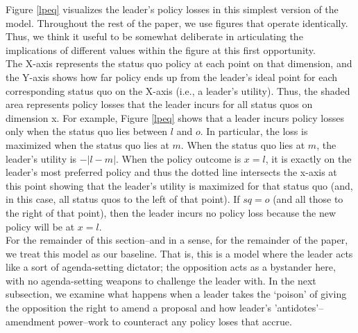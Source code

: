 \documentclass[12pt]{article}
\theoremstyle{plain}		      \newtheorem{assn}{Assumption}
\theoremstyle{plain}		      \newtheorem{prop}{Proposition}
\theoremstyle{plain}		      \newtheorem{lemma}{Lemma}
\theoremstyle{plain}	          \newtheorem{imp}{Implication}
\theoremstyle{plain}	          \newtheorem{hyp}{Hypothesis}
\theoremstyle{definition}		  \newtheorem{defn}{Definition}
\theoremstyle{remark}	          \newtheorem{rem}{Remark}
\theoremstyle{definition}         \newtheorem{case}{Case}
\begin{document}
\indent Figure \ref{lpeq} visualizes the leader's policy losses in this simplest version of the model. Throughout the rest of the paper, we use figures that operate identically. Thus, we think it useful to be somewhat deliberate in articulating the implications of different values within the figure at this first opportunity. 
\\
\indent The X-axis represents the status quo policy at each point on that dimension, and the Y-axis shows how far policy ends up from the leader's ideal point for each corresponding status quo on the X-axis (i.e., a leader's utility). Thus, the shaded area represents policy losses that the leader incurs for all status quos on dimension x. For example, Figure \ref{lpeq} shows that a leader incurs policy losses only when the status quo lies between $l$ and $o$. In particular, the loss is maximized when the status quo lies at $m$. When the status quo lies at $m$, the leader's utility is $-|l-m|$. When the policy outcome is $x=l$, it is exactly on the leader's most preferred policy and thus the dotted line intersects the x-axis at this point showing that the leader's utility is maximized for that status quo (and, in this case, all status quos to the left of that point). If $sq=o$  (and all those to the right of that point), then the leader incurs no policy loss because the new policy will be at $x=l$.
\\
\indent For the remainder of this section--and in a sense, for the remainder of the paper, we treat this model as our baseline. That is, this is a model where the leader acts like a sort of agenda-setting dictator; the opposition acts as a bystander here, with no agenda-setting weapons to challenge the leader with. In the next subsection, we examine what happens when a leader takes the `poison' of giving the opposition the right to amend a proposal and how leader's 'antidotes'--amendment power--work to counteract any policy loses that accrue. 

\FloatBarrier
\end{document}

